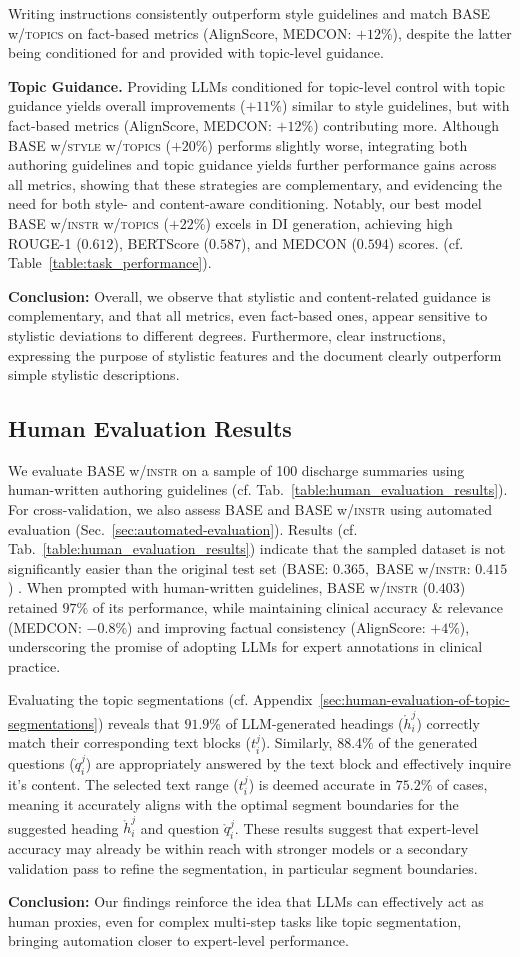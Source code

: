 Writing instructions consistently outperform style guidelines and match BASE w/\textsc{topics} on fact-based metrics (AlignScore, MEDCON: $+12\%$), despite the latter being conditioned for and provided with topic-level guidance.

\textbf{Topic Guidance.} Providing LLMs conditioned for topic-level control with topic guidance yields overall improvements ($+11\%$) similar to style guidelines, but with fact-based metrics (AlignScore, MEDCON: $+12\%$) contributing more. 
Although BASE w/\textsc{style} w/\textsc{topics} ($+20\%$) performs slightly worse, integrating both authoring guidelines and topic guidance yields further performance gains across all metrics, showing that these strategies are complementary, and evidencing the need for both style- and  content-aware conditioning. Notably, our best model BASE w/\textsc{instr} w/\textsc{topics} ($+22\%$) excels in DI generation, achieving high ROUGE-1 ($0.612$), BERTScore ($0.587$), and MEDCON ($0.594$) scores. (cf. Table~\ref{table:task_performance}).

\textbf{Conclusion:} Overall, we observe that stylistic and content-related guidance is complementary, and that all metrics, even fact-based ones, appear sensitive to stylistic deviations to different degrees. Furthermore, clear instructions, expressing the purpose of stylistic features and the document clearly outperform simple stylistic descriptions.

\subsection{Human Evaluation Results}
We evaluate BASE w/\textsc{instr} on a sample of 100 discharge summaries using human-written authoring guidelines (cf. Tab.~\ref{table:human_evaluation_results}). For cross-validation, we also assess BASE and BASE w/\textsc{instr} using automated evaluation (Sec.~\ref{sec:automated-evaluation}). Results (cf. Tab.~\ref{table:human_evaluation_results}) indicate that the sampled dataset is not significantly easier than the original test set (BASE: $0.365,$ BASE w/\textsc{instr}: $0.415$) . When prompted with human-written guidelines, BASE w/\textsc{instr} ($0.403$) retained $97\%$ of its performance, while maintaining clinical accuracy \& relevance (MEDCON: $-0.8\%$) and improving factual consistency (AlignScore: $+4\%$), underscoring the promise of adopting LLMs for expert annotations in clinical practice.

Evaluating the topic segmentations (cf. Appendix~\ref{sec:human-evaluation-of-topic-segmentations}) reveals that $91.9\%$ of LLM-generated headings ($\mathring{h}_i^j$) correctly match their corresponding text blocks ($t_i^j$). Similarly, $88.4\%$  of the generated questions ($\mathring{q}_i^j$) are appropriately answered by the text block and effectively inquire it's content. The selected text range ($t_i^j$) is deemed accurate in $75.2\%$ of cases, meaning it accurately aligns with the optimal segment boundaries for the suggested heading $\mathring{h}_i^j$ and question $\mathring{q}_i^j$. These results suggest that expert-level accuracy may already be within reach with stronger models or a secondary validation pass to refine the segmentation, in particular segment boundaries. 

\textbf{Conclusion:} Our findings reinforce the idea that LLMs can effectively act as human proxies, even for complex multi-step tasks like topic segmentation,  bringing automation closer to expert-level performance.